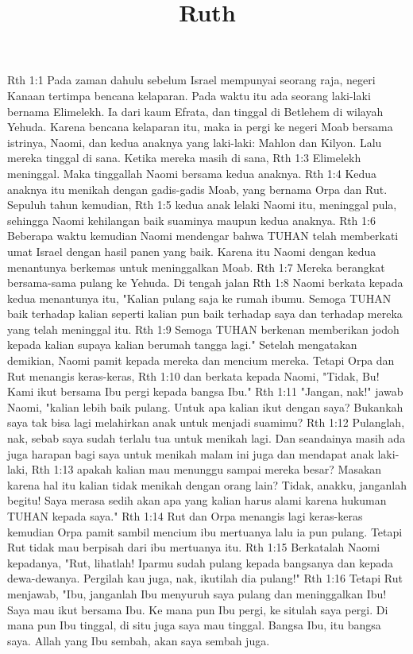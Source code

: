 

\title{Ruth}

Rth 1:1  Pada zaman dahulu sebelum Israel mempunyai seorang raja, negeri Kanaan tertimpa bencana kelaparan. Pada waktu itu ada seorang laki-laki bernama Elimelekh. Ia dari kaum Efrata, dan tinggal di Betlehem di wilayah Yehuda. Karena bencana kelaparan itu, maka ia pergi ke negeri Moab bersama istrinya, Naomi, dan kedua anaknya yang laki-laki: Mahlon dan Kilyon. Lalu mereka tinggal di sana. Ketika mereka masih di sana,
Rth 1:3  Elimelekh meninggal. Maka tinggallah Naomi bersama kedua anaknya.
Rth 1:4  Kedua anaknya itu menikah dengan gadis-gadis Moab, yang bernama Orpa dan Rut. Sepuluh tahun kemudian,
Rth 1:5  kedua anak lelaki Naomi itu, meninggal pula, sehingga Naomi kehilangan baik suaminya maupun kedua anaknya.
Rth 1:6  Beberapa waktu kemudian Naomi mendengar bahwa TUHAN telah memberkati umat Israel dengan hasil panen yang baik. Karena itu Naomi dengan kedua menantunya berkemas untuk meninggalkan Moab.
Rth 1:7  Mereka berangkat bersama-sama pulang ke Yehuda. Di tengah jalan
Rth 1:8  Naomi berkata kepada kedua menantunya itu, "Kalian pulang saja ke rumah ibumu. Semoga TUHAN baik terhadap kalian seperti kalian pun baik terhadap saya dan terhadap mereka yang telah meninggal itu.
Rth 1:9  Semoga TUHAN berkenan memberikan jodoh kepada kalian supaya kalian berumah tangga lagi." Setelah mengatakan demikian, Naomi pamit kepada mereka dan mencium mereka. Tetapi Orpa dan Rut menangis keras-keras,
Rth 1:10  dan berkata kepada Naomi, "Tidak, Bu! Kami ikut bersama Ibu pergi kepada bangsa Ibu."
Rth 1:11  "Jangan, nak!" jawab Naomi, "kalian lebih baik pulang. Untuk apa kalian ikut dengan saya? Bukankah saya tak bisa lagi melahirkan anak untuk menjadi suamimu?
Rth 1:12  Pulanglah, nak, sebab saya sudah terlalu tua untuk menikah lagi. Dan seandainya masih ada juga harapan bagi saya untuk menikah malam ini juga dan mendapat anak laki-laki,
Rth 1:13  apakah kalian mau menunggu sampai mereka besar? Masakan karena hal itu kalian tidak menikah dengan orang lain? Tidak, anakku, janganlah begitu! Saya merasa sedih akan apa yang kalian harus alami karena hukuman TUHAN kepada saya."
Rth 1:14  Rut dan Orpa menangis lagi keras-keras kemudian Orpa pamit sambil mencium ibu mertuanya lalu ia pun pulang. Tetapi Rut tidak mau berpisah dari ibu mertuanya itu.
Rth 1:15  Berkatalah Naomi kepadanya, "Rut, lihatlah! Iparmu sudah pulang kepada bangsanya dan kepada dewa-dewanya. Pergilah kau juga, nak, ikutilah dia pulang!"
Rth 1:16  Tetapi Rut menjawab, "Ibu, janganlah Ibu menyuruh saya pulang dan meninggalkan Ibu! Saya mau ikut bersama Ibu. Ke mana pun Ibu pergi, ke situlah saya pergi. Di mana pun Ibu tinggal, di situ juga saya mau tinggal. Bangsa Ibu, itu bangsa saya. Allah yang Ibu sembah, akan saya sembah juga.
